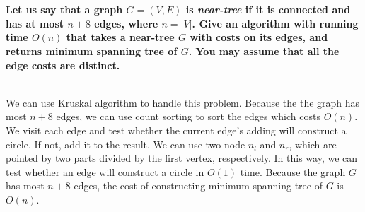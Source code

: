 
\chapter{}
\textbf{
Let us say that a graph $G=(V,E)$ is \emph{near-tree} if it is connected and has at most $n+8$ edges, where $n=|V|$. Give an algorithm with running time $O(n)$ that takes a near-tree $G$ with costs on its edges, and returns minimum spanning tree of $G$. You may assume that all the edge costs are distinct.
}


\hspace*{\fill} \\

We can use Kruskal algorithm to handle this problem. Because the the graph has most $n+8$ edges, we can use count sorting to sort the edges which costs $O(n)$. We visit each edge and test whether the current edge's adding will construct a circle. If not, add it to the result. We can use two node $n_l$ and $n_r$, which are pointed by two parts divided by the first vertex, respectively. In this way, we can test whether an edge will construct a circle in $O(1)$ time. Because the graph $G$ has most $n+8$ edges, the cost of constructing minimum spanning tree of $G$ is $O(n)$.